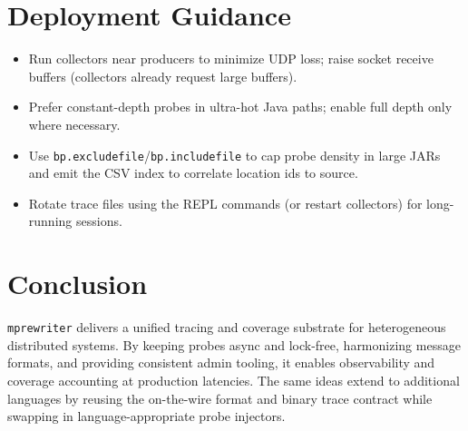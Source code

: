 \documentclass[11pt]{article}
\begin{document}
\section{Deployment Guidance}
\begin{itemize}[noitemsep]
  \item Run collectors near producers to minimize UDP loss; raise socket receive buffers (collectors already request large buffers).
  \item Prefer constant-depth probes in ultra-hot Java paths; enable full depth only where necessary.
  \item Use \texttt{bp.excludefile}/\texttt{bp.includefile} to cap probe density in large JARs and emit the CSV index to correlate location ids to source.
  \item Rotate trace files using the REPL commands (or restart collectors) for long-running sessions.
\end{itemize}

\section{Conclusion}
\texttt{mprewriter} delivers a unified tracing and coverage substrate for heterogeneous distributed systems. By keeping probes async and lock-free, harmonizing message formats, and providing consistent admin tooling, it enables observability and coverage accounting at production latencies. The same ideas extend to additional languages by reusing the on-the-wire format and binary trace contract while swapping in language-appropriate probe injectors.
\end{document}
